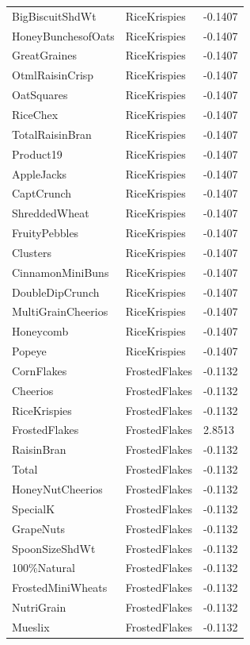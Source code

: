 \begin{table}[!htbp]
\begin{tabular}{lll}
\\
BigBiscuitShdWt & RiceKrispies & -0.1407
\\
HoneyBunchesofOats & RiceKrispies & -0.1407
\\
GreatGraines & RiceKrispies & -0.1407
\\
OtmlRaisinCrisp & RiceKrispies & -0.1407
\\
OatSquares & RiceKrispies & -0.1407
\\
RiceChex & RiceKrispies & -0.1407
\\
TotalRaisinBran & RiceKrispies & -0.1407
\\
Product19 & RiceKrispies & -0.1407
\\
AppleJacks & RiceKrispies & -0.1407
\\
CaptCrunch & RiceKrispies & -0.1407
\\
ShreddedWheat & RiceKrispies & -0.1407
\\
FruityPebbles & RiceKrispies & -0.1407
\\
Clusters & RiceKrispies & -0.1407
\\
CinnamonMiniBuns & RiceKrispies & -0.1407
\\
DoubleDipCrunch & RiceKrispies & -0.1407
\\
MultiGrainCheerios & RiceKrispies & -0.1407
\\
Honeycomb & RiceKrispies & -0.1407
\\
Popeye & RiceKrispies & -0.1407
\\
CornFlakes & FrostedFlakes & -0.1132
\\
Cheerios & FrostedFlakes & -0.1132
\\
RiceKrispies & FrostedFlakes & -0.1132
\\
FrostedFlakes & FrostedFlakes & 2.8513
\\
RaisinBran & FrostedFlakes & -0.1132
\\
Total & FrostedFlakes & -0.1132
\\
HoneyNutCheerios & FrostedFlakes & -0.1132
\\
SpecialK & FrostedFlakes & -0.1132
\\
GrapeNuts & FrostedFlakes & -0.1132
\\
SpoonSizeShdWt & FrostedFlakes & -0.1132
\\
100\%Natural & FrostedFlakes & -0.1132
\\
FrostedMiniWheats & FrostedFlakes & -0.1132
\\
NutriGrain & FrostedFlakes & -0.1132
\\
Mueslix & FrostedFlakes & -0.1132
\\

\end{tabular}
\end{table}
